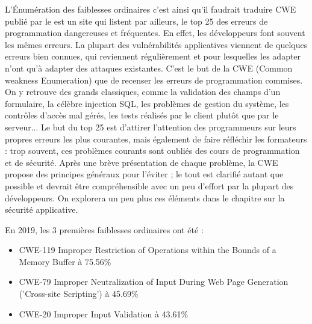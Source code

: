  L'Énumération des faiblesses ordinaires c'est ainsi qu'il faudrait traduire CWE publié par le   est un site qui listent par ailleurs, le top 25 des  erreurs de programmation dangereuses et fréquentes. 
En effet, les  développeurs font souvent les mêmes erreurs.
La plupart des vulnérabilités applicatives viennent de quelques erreurs bien connues, qui reviennent régulièrement et pour lesquelles les adapter n'ont qu'à adapter des attaques existantes.
C'est le but de la CWE (Common weakness Enumeration) que de recenser les erreurs de programmation commises. 
On y retrouve des grands classiques, comme la validation des champs d'un formulaire, la célèbre injection SQL, les problèmes de gestion du système, les contrôles d'accès mal gérés, les tests réalisés par le client plutôt que par le serveur...
Le but du top 25 est d'attirer l'attention des programmeurs sur leurs propres erreurs les plus courantes, mais également de faire réfléchir les formateurs : trop souvent, ces problèmes courants sont oubliés des cours de programmation et de sécurité. Après une brève présentation de chaque problème, la CWE propose des principes généraux pour l'éviter ; le tout est clarifié autant que possible et devrait être compréhensible avec un peu d'effort par la plupart des développeurs. On explorera un peu plus ces éléments dans le chapitre sur la sécurité applicative.

En 2019, les 3 premières faiblesses ordinaires ont été : 

\begin{itemize}
  \item CWE-119	Improper Restriction of Operations within the Bounds of a Memory Buffer	à 75.56\%
  \item CWE-79	Improper Neutralization of Input During Web Page Generation ('Cross-site Scripting')	à 45.69\%
  \item CWE-20	Improper Input Validation à 43.61\%
\end{itemize}





